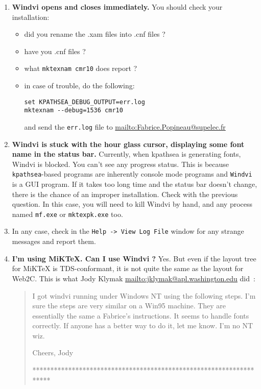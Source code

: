 \documentclass[a4paper,11pt]{article}
\def\WDVI{\textsf{Windvi}}
\begin{document}
\begin{enumerate}
\item \textbf{\WDVI{} opens and closes immediately.}
You should check your installation:
\begin{itemize}
\item did you rename the .xam files into .cnf files ?
\item have you .cnf files ?
\item what \texttt{mktexnam cmr10} does report ?
\item in case of trouble, do the following:
\begin{verbatim}
set KPATHSEA_DEBUG_OUTPUT=err.log
mktexnam --debug=1536 cmr10
\end{verbatim}
and send the \texttt{err.log} file to \url{mailto:Fabrice.Popineau@supelec.fr}
\end{itemize}

\item \textbf{\WDVI{} is stuck with the hour glass cursor, displaying
    some font name in the status bar.}  Currently, when kpathsea is
  generating fonts, \WDVI{} is blocked.  You can't see any progress
  status. This is because \texttt{kpathsea}-based programs are
  inherently console mode programs and \texttt{\WDVI{}} is a GUI
  program. If it takes too long time and the status bar doesn't
  change, there is the chance of an improper installation. Check with
  the previous question. In this case, you will need to kill \WDVI{}
  by hand, and any process named \texttt{mf.exe} or
  \texttt{mktexpk.exe} too.
\item In any case, check in the \texttt{Help -> View Log File} window
  for any strange messages and report them.
\item \textbf{I'm using MiKTeX. Can I use \WDVI{} ?} Yes. But even if
  the layout tree for MiKTeX is TDS-conformant, it is not quite the
  same as the layout for Web2C. This is what Jody Klymak
  \url{mailto:jklymak@apl.washington.edu} did~:

  \begin{quotation}
    I  got windvi running under Windows  NT using the following steps. 
    I'm sure the steps are very similar on a  Win95 machine.  They are
    essentially the same a Fabrice's instructions.  It seems to handle
    fonts  correctly.  If anyone has  a  better way  to do  it, let me
    know.  I'm no NT wiz.

    Cheers,  Jody

    *******************************************************************


\end{quotation}
\end{enumerate}
\end{document}
